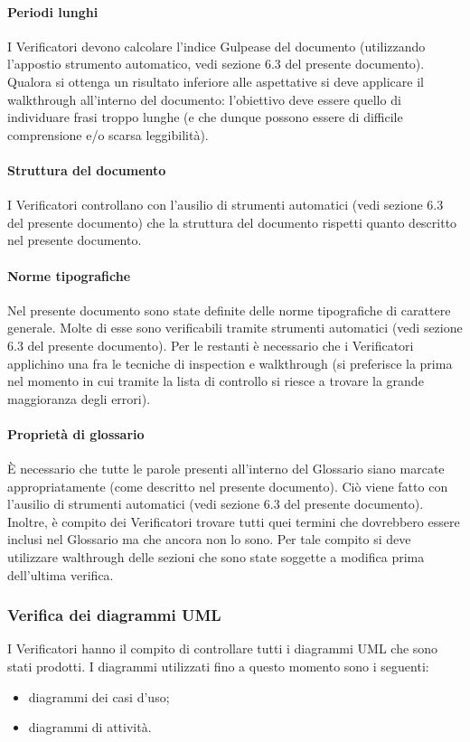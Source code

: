 			\paragraph{Periodi lunghi}
				I Verificatori devono calcolare l'indice Gulpease del documento (utilizzando l'appostio strumento automatico, vedi sezione 6.3 del presente documento). Qualora si ottenga un 
				risultato inferiore alle aspettative si deve applicare il walkthrough all'interno del documento: l'obiettivo deve essere quello di 
				individuare frasi troppo lunghe (e che dunque possono essere di difficile comprensione e/o scarsa leggibilità).
			\paragraph{Struttura del documento}
				I Verificatori controllano con l'ausilio di strumenti automatici (vedi sezione 6.3 del presente documento) che la struttura del documento rispetti quanto descritto nel presente 
				documento.
			\paragraph{Norme tipografiche}
				Nel presente documento sono state definite delle norme tipografiche di carattere generale. Molte di esse sono verificabili tramite 
				strumenti automatici (vedi sezione 6.3 del presente documento). Per le restanti è necessario che i Verificatori applichino una fra le tecniche di inspection e walkthrough 
				(si preferisce la prima nel momento in cui tramite la lista di controllo si riesce a trovare la grande maggioranza degli errori).
			\paragraph{Proprietà di glossario}
				È necessario che tutte le parole presenti all'interno del Glossario siano marcate appropriatamente (come descritto nel presente 
				documento). Ciò viene fatto con l'ausilio di strumenti automatici (vedi sezione 6.3 del presente documento). Inoltre, è compito dei Verificatori trovare tutti quei termini che 
				dovrebbero essere inclusi nel Glossario ma che ancora non lo sono. Per tale compito si deve utilizzare walthrough delle sezioni che sono 
				state soggette a modifica prima dell'ultima verifica.
		\subsubsection{Verifica dei diagrammi UML}
			I Verificatori hanno il compito di controllare tutti i diagrammi UML che sono stati prodotti. I diagrammi utilizzati fino a questo momento 
			sono i seguenti:
			\begin{itemize}
				\item diagrammi dei casi d'uso;
				\item diagrammi di attività.
			\end{itemize}

